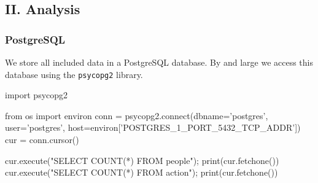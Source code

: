 \documentclass[]{report}
\newenvironment{Shaded}{}{}
\newcommand{\KeywordTok}[1]{\textcolor[rgb]{0.00,0.44,0.13}{\textbf{{#1}}}}
\newcommand{\DataTypeTok}[1]{\textcolor[rgb]{0.56,0.13,0.00}{{#1}}}
\newcommand{\CharTok}[1]{\textcolor[rgb]{0.25,0.44,0.63}{{#1}}}
\newcommand{\StringTok}[1]{\textcolor[rgb]{0.25,0.44,0.63}{{#1}}}
\newcommand{\OtherTok}[1]{\textcolor[rgb]{0.00,0.44,0.13}{{#1}}}
\newcommand{\NormalTok}[1]{{#1}}
\begin{document}
\begin{Shaded}
\end{Shaded}

\subsection{II. Analysis}\label{ii.-analysis}

\subsubsection{PostgreSQL}\label{postgresql}

We store all included data in a PostgreSQL database. By and large we
access this database using the \texttt{psycopg2} library.

\begin{Shaded}
\begin{Highlighting}[]
\CharTok{import} \NormalTok{psycopg2}

\CharTok{from} \NormalTok{os }\CharTok{import} \NormalTok{environ}
\NormalTok{conn = psycopg2.}\OtherTok{connect}\NormalTok{(dbname=}\StringTok{'postgres'}\NormalTok{, }
                        \NormalTok{user=}\StringTok{'postgres'}\NormalTok{,}
                        \NormalTok{host=environ[}\StringTok{'POSTGRES_1_PORT_5432_TCP_ADDR'}\NormalTok{])}
\NormalTok{cur = conn.cursor()}
\end{Highlighting}
\end{Shaded}

\begin{Shaded}
\begin{Highlighting}[]
\NormalTok{cur.execute(}\StringTok{"SELECT COUNT(*) FROM people"}\NormalTok{); }\DataTypeTok{print}\NormalTok{(cur.fetchone())}
\NormalTok{cur.execute(}\StringTok{"SELECT COUNT(*) FROM action"}\NormalTok{); }\DataTypeTok{print}\NormalTok{(cur.fetchone())}
\end{Highlighting}
\end{Shaded}
\end{document}
